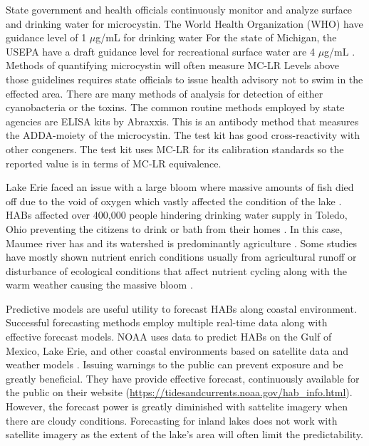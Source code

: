 State government and health officials continuously monitor and analyze surface and drinking water for microcystin. The World Health Organization (WHO) have guidance level of 1 $\mu$g/mL for drinking water \cite{world_health_organization_guidelines_2003} For the state of Michigan, the USEPA have a draft guidance level for recreational surface water are 4 $\mu$g/mL \cite{us_epa_draft_2016}. Methods of quantifying microcystin will often measure MC-LR Levels above those guidelines requires state officials to issue health advisory not to swim in the effected area.  There are many methods of analysis for detection of either cyanobacteria or the toxins. The common routine methods employed by state agencies are ELISA kits by Abraxxis. This is an antibody method that measures the ADDA-moiety of the microcystin.
The test kit has good cross-reactivity with other congeners.
The test kit uses MC-LR for its calibration standards so the reported value is in terms of MC-LR equivalence.

Lake Erie faced an  issue with a large bloom where massive amounts of fish died off due to the void of oxygen which vastly affected the condition of the lake \cite{charlton_oxygen_1980}. HABs affected over 400,000 people hindering drinking water supply in Toledo, Ohio preventing the citizens to drink or bath from their homes \cite{mann_toledo_2014}. In this case, Maumee river has and its watershed is predominantly agriculture \cite{}. Some studies have mostly shown nutrient enrich conditions usually from agricultural runoff or disturbance of ecological conditions that affect nutrient cycling along with the warm weather causing the massive bloom \cite{ahn_evaluation_2011, ahn_rainfall_2002, anderson_harmful_2002, jiang_statistical_2008}.



Predictive models are useful utility to forecast HABs along coastal environment. Successful forecasting methods employ multiple real-time data along with effective forecast models.  NOAA uses data to predict HABs on the Gulf of Mexico, Lake Erie, and other coastal environments based on satellite data and weather models \cite{kavanaugh_assessment_2013} . Issuing warnings to the public can prevent exposure and be greatly beneficial. They have provide effective forecast, continuously available for the public on their website (\url{https://tidesandcurrents.noaa.gov/hab_info.html}). However, the forecast power is greatly diminished with sattelite imagery when there are cloudy conditions. Forecasting for inland lakes does not work with satellite imagery as the extent of the lake's area will often limit the predictability.



